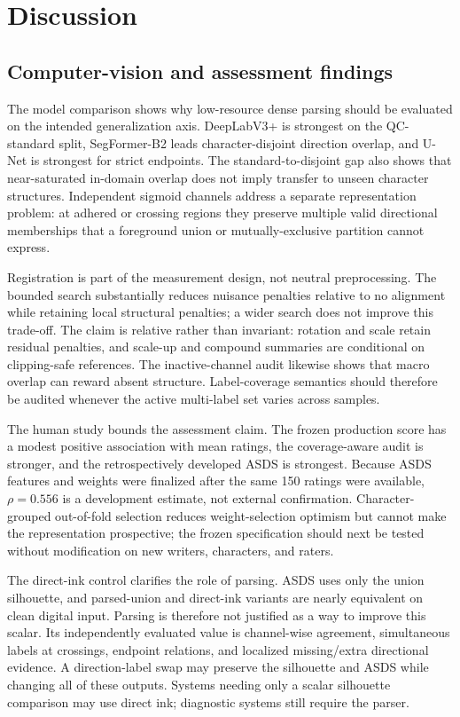 \section{Discussion}
\label{sec:discussion}

\subsection{Computer-vision and assessment findings}

The model comparison shows why low-resource dense parsing should be evaluated
on the intended generalization axis. DeepLabV3+ is strongest on the
QC-standard split, SegFormer-B2 leads character-disjoint direction overlap,
and U-Net is strongest for strict endpoints. The standard-to-disjoint gap
also shows that near-saturated in-domain overlap does not imply transfer to
unseen character structures. Independent sigmoid channels address a separate
representation problem: at adhered or crossing regions they preserve
multiple valid directional memberships that a foreground union or
mutually-exclusive partition cannot express.

Registration is part of the measurement design, not neutral preprocessing.
The bounded search substantially reduces nuisance penalties relative to no
alignment while retaining local structural penalties; a wider search does
not improve this trade-off. The claim is relative rather than invariant:
rotation and scale retain residual penalties, and scale-up and compound
summaries are conditional on clipping-safe references. The inactive-channel
audit likewise shows that macro overlap can reward absent structure.
Label-coverage semantics should therefore be audited whenever the active
multi-label set varies across samples.

The human study bounds the assessment claim. The frozen production score has
a modest positive association with mean ratings, the coverage-aware audit is
stronger, and the retrospectively developed ASDS is strongest. Because ASDS
features and weights were finalized after the same 150 ratings were
available, \(\rho=0.556\) is a development estimate, not external
confirmation. Character-grouped out-of-fold selection reduces
weight-selection optimism but cannot make the representation prospective;
the frozen specification should next be tested without modification on new
writers, characters, and raters.

The direct-ink control clarifies the role of parsing. ASDS uses only the union
silhouette, and parsed-union and direct-ink variants are nearly equivalent on
clean digital input. Parsing is therefore not justified as a way to improve
this scalar. Its independently evaluated value is channel-wise agreement,
simultaneous labels at crossings, endpoint relations, and localized
missing/extra directional evidence. A direction-label swap may preserve the
silhouette and ASDS while changing all of these outputs. Systems needing only
a scalar silhouette comparison may use direct ink; diagnostic systems still
require the parser.

